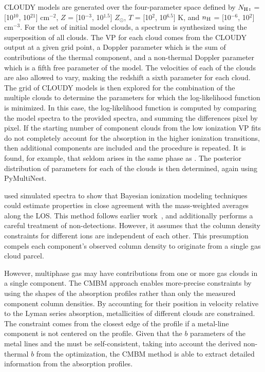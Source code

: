 \documentclass[fleqn,usenatbib]{mnras}
\begin{document}
CLOUDY models are generated over the four-parameter space defined by $N_{\ion{H}{I}}$ = [10$^{10}$, 10$^{21}$] cm$^{-2}$, $Z$ = [10$^{-3}$, 10$^{1.5}$] $Z_\odot$, $T$ = [10$^{2}$, 10$^{6.5}$] K, and $n_{\rm H}$ = [10$^{-6}$, 10$^{2}$] cm$^{-3}$.
For the set of initial model clouds, a spectrum is synthesized using the superposition of all clouds.
The VP for each cloud comes from the CLOUDY output at a given grid point, a Doppler parameter which is the sum of contributions of the thermal component, and a non-thermal Doppler parameter which is a fifth free parameter of the model.
The velocities of each of the clouds are also allowed to vary, making the redshift a sixth parameter for each cloud.
The grid of CLOUDY models is then explored for the combination of the multiple clouds to determine the parameters for which the log-likelihood function is minimized.
In this case, the log-likelihood function is computed by comparing the model spectra to the provided spectra, and summing the differences pixel by pixel.
If the starting number of component clouds from the low ionization VP fits do not completely account for the absorption in the higher ionization transitions, then additional components are included and the procedure is repeated.
It is found, for example, that  seldom arises in the same phase as .
The posterior distribution of parameters for each of the clouds is then determined, again using PyMultiNest.

\cite{liang2018Observing} used simulated spectra to show that Bayesian ionization modeling techniques could estimate properties in close agreement with the  mass-weighted averages along the LOS.
This method follows earlier work~\citep{crighton2015Metalenriched, fumagalli2016Physical}, and additionally performs a careful treatment of non-detections.
However, it assumes that the column density constraints for different ions are independent of each other.
This presumption compels each component's observed column density to originate from a single gas cloud parcel.

However, multiphase gas may have contributions from one or more gas clouds in a single component.
The CMBM approach enables more-precise constraints by using the shapes of the absorption profiles rather than only the measured component column densities.
By accounting for their position in velocity relative to the Lyman series absorption, metallicities of different clouds are constrained.
The constraint comes from the closest edge of the  profile if a metal-line component is not centered on the  profile.
Given that the $b$ parameters of the metal lines and the  must be self-consistent, taking into account the derived non-thermal $b$ from the optimization, the CMBM method is able to extract detailed information from the absorption profiles.
\end{document}
